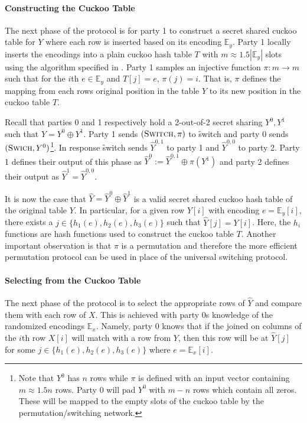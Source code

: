 \paragraph{Constructing the Cuckoo Table}

The next phase of the protocol is for party 1 to construct a secret shared cuckoo table for $Y$ where each row is inserted based on its encoding $\mathbb{E}_y$. Party 1 locally inserts the encodings into a plain cuckoo hash table $T$ with $m\approx 1.5|\mathbb{E}_y|$ slots using the algorithm specified in . Party 1 samples an injective function $\pi : m\rightarrow m$ such that for the $i$th $e\in \mathbb{E}_y$ and $T[j]=e$, $\pi(j)=i$. That is, $\pi$ defines the mapping from each rows original position in the table $Y$ to its new position in the cuckoo table $T$.

Recall that parties 0 and 1 respectively hold a 2-out-of-2 secret sharing $Y^0,Y^1$ such that $Y=Y^0\oplus Y^1$. 
Party 1 sends $(\textsc{Switch}, \pi)$ to \f{switch} and party 0 sends $(\textsc{Swich}, Y^0)$\footnote{Note that $Y^0$ has $n$ rows while $\pi$ is defined with an input vector containing $m\approx 1.5n$ rows. Party 0 will pad $Y^0$ with $m-n$ rows which contain all zeros. These will be mapped to the empty slots of the cuckoo table by the permutation/switching network.}. In response \f{switch} sends $\hat Y^{0,1}$ to party 1  and $\hat Y^{0,0}$ to party 2. Party 1 defines their output of this phase as $\hat Y^0:=\hat Y^{0,1} \oplus \pi(Y^1)$ and party 2 defines their output as $\hat Y^{1} =\hat Y^{0,0}$.

It is now the case that $\hat Y = \hat Y^0\oplus \hat Y^1$ is a valid secret shared cuckoo hash table of the original table $Y$. In particular, for a given row $Y[i]$ with encoding $e=\mathbb{E}_y[i]$, there exists a $j\in \{h_1(e),h_2(e), h_3(e)\}$ such that  $\hat Y[j] = Y[i]$. Here, the $h_i$ functions are hash functions used to construct the cuckoo table $T$. Another important observation is that $\pi$ is a permutation and therefore the more efficient permutation protocol can be used in place of the universal switching protocol.

\paragraph{Selecting from the Cuckoo Table}

The next phase of the protocol is to select the appropriate rows of $\hat Y$ and compare them with each row of $X$. This is achieved with party 0s knowledge of the randomized encodings $\mathbb{E}_x$. Namely, party 0 knows that if the joined on columns of the $i$th row $X[i]$ will match with a row from $Y$, then this row will be at $\hat Y[j]$ for some $j\in \{h_1(e),h_2(e), h_3(e)\}$ where  $e=\mathbb{E}_x[i]$. 

